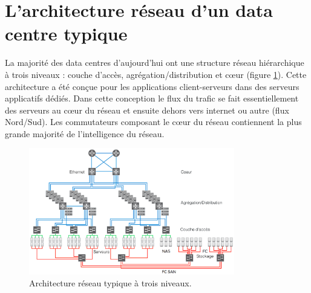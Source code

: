 \section{L'architecture réseau d'un data centre typique}

La majorité des data centres d'aujourd'hui ont une structure réseau hiérarchique à trois niveaux : couche d'accès, agrégation/distribution et cœur (figure \ref{legacy_archi}). Cette architecture a été conçue pour les applications client-serveurs dans des serveurs applicatifs dédiés. Dans cette conception le flux du trafic se fait essentiellement des serveurs au cœur du réseau et ensuite dehors vers internet ou autre (flux Nord/Sud). Les commutateurs composant le cœur du réseau contiennent la plus grande majorité de l'intelligence du réseau. 



\begin{figure}[h]
\begin{center}
\includegraphics[width=0.8\textwidth]{images/LegacyNetworkArchitecture} 
\caption{Architecture réseau typique à trois niveaux. \cite{cloudReadyNetworkJuniper}} \label{legacy_archi}
\end{center}
\end{figure}

